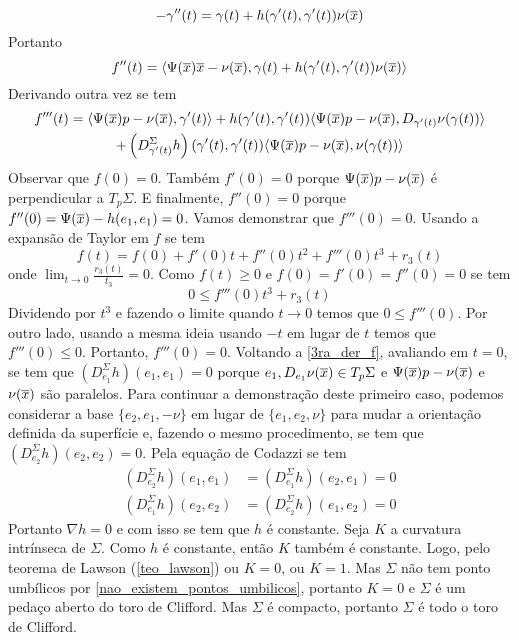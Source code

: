 \begin{equation*}
	-\gamma''(t) = \gamma(t) + h(\gamma'(t), \gamma'(t)) \nu(\overline{x})
\end{equation*}
Portanto
\begin{equation*}
	f''(t) = \langle \Psi(\overline{x}) \overline{x} - \nu(\overline{x}), \gamma(t) + h(\gamma'(t), \gamma'(t)) \nu(\overline{x}) \rangle
\end{equation*}
Derivando outra vez se tem
\begin{multline}\label{3ra_der_f}
	f'''(t) = \langle \Psi(\overline{x})p - \nu(\overline{x}), \gamma'(t) \rangle + h(\gamma'(t), \gamma'(t)) \langle \Psi(\overline{x})p - \nu(\overline{x}), D_{\gamma'(t)} \nu(\gamma(t)) \rangle\\
	+ \left( D_{\gamma'(t)}^{\Sigma} h \right) (\gamma'(t), \gamma'(t)) \langle \Psi(\overline{x})p - \nu(\overline{x}), \nu(\gamma(t)) \rangle
\end{multline}
Observar que $f(0)=0$. Também $f'(0)=0$ porque $\Psi(\overline{x})p - \nu(\overline{x})$ é perpendicular a $T_p \Sigma$. E finalmente, $f''(0)=0$ porque $f''(0) = \Psi(\overline{x}) - h(e_1,e_1)=0$.
Vamos demonstrar que $f'''(0)=0$. Usando a expansão de Taylor em $f$ se tem
\begin{equation*}
	f(t) = f(0) + f'(0)t + f''(0)t^2 + f'''(0)t^3 + r_3(t)
\end{equation*}  
onde $\lim_{t \rightarrow 0} \frac{r_3(t)}{t_3}=0$. Como $f(t) \geq 0$ e $f(0)=f'(0)=f''(0)=0$ se tem
\begin{equation*}
	0 \leq f'''(0) t^3 + r_3(t)
\end{equation*}
Dividendo por $t^3$ e fazendo o limite quando $t \rightarrow 0$ temos que $0 \leq f'''(0)$. Por outro lado, usando a mesma ideia usando $-t$ em lugar de  $t$ temos que $f'''(0) \leq 0$. Portanto, $f'''(0)=0$.
Voltando  a \eqref{3ra_der_f}, avaliando em $t=0$, se tem que $(D_{e_1}^{\Sigma} h) (e_1,e_1) = 0$ porque $e_1, D_{e_1} \nu(\overline{x}) \in T_p \Sigma$ e $\Psi(\overline{x})p - \nu(\overline{x})$ e $\nu(\overline{x})$ são paralelos.
Para continuar a demonstração deste primeiro caso, podemos considerar a base $\{ e_2, e_1, -\nu \}$ em lugar de $\{ e_1, e_2, \nu \}$ para mudar a orientação definida da superfície e, fazendo o mesmo procedimento, se tem que $(D_{e_2}^{\Sigma} h) (e_2,e_2)=0$.
Pela equação de Codazzi se tem
\begin{align*}
	(D_{e_2}^{\Sigma} h) (e_1,e_1) &= (D_{e_1}^{\Sigma} h) (e_2,e_1) = 0\\
	(D_{e_1}^{\Sigma} h) (e_2,e_2) &= (D_{e_2}^{\Sigma} h) (e_1,e_2) = 0
\end{align*}
Portanto $\nabla h = 0$ e com isso se tem que $h$ é constante. Seja $K$ a curvatura intrínseca de $\Sigma$. Como $h$ é constante, então $K$ também é constante. Logo, pelo teorema de Lawson (\ref{teo_lawson}) ou $K=0$, ou $K=1$. Mas $\Sigma$ não tem ponto umbílicos por \ref{nao_existem_pontos_umbilicos}, portanto $K=0$ e $\Sigma$ é um pedaço aberto do toro de Clifford. Mas $\Sigma$ é compacto, portanto $\Sigma$ é todo o toro de Clifford.

